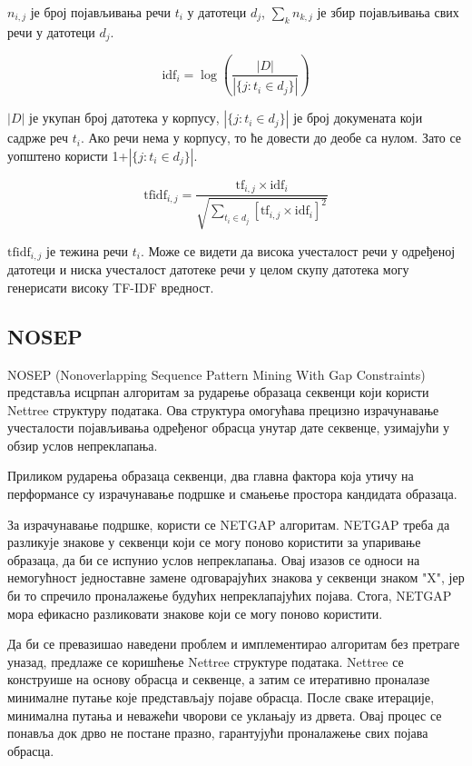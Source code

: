 \documentclass[12pt]{article}
\begin{document}
$n_{i,j}$  је број појављивања речи $t_{i}$ у датотеци $d_{j}$,
$\sum_{k} n_{k,j}$ је збир појављивања свих речи у датотеци
$d_{j}$.

$$\mathrm{idf}_i = \log \left(\frac{|D|}{|\{j : t_i \in d_j\}|}\right) $$

$|D|$ је укупан број датотека у корпусу, $|\{j : t_i \in d_j\}|$
је број докумената који садрже реч $t_{i}$. Ако
речи нема у корпусу, то ће довести до деобе са нулом. Зато се
уопштено користи 1+$|\{j : t_i \in d_j\}|$.

$$\mathrm{tfidf}_{i,j} = \frac{\mathrm{tf}_{i,j} \times \mathrm{idf}_{i}}{\sqrt{\sum_{t_i \in d_j} \left[\mathrm{tf}_{i,j} \times \mathrm{idf}_i\right]^2}}$$


$\mathrm{tfidf}_{i,j}$ је тежина речи ${t}_{i}$. Може се видети да висока
учесталост речи у одређеној датотеци и ниска учесталост датотеке
речи у целом скупу датотека могу генерисати високу TF-IDF вредност. 

\subsection{NOSEP}

NOSEP\cite{8053457} (Nonoverlapping Sequence Pattern Mining With Gap Constraints) представља исцрпан алгоритам за рударење образаца секвенци који користи Nettree структуру података. Ова структура омогућава прецизно израчунавање учесталости појављивања одређеног обрасца унутар дате секвенце, узимајући у обзир услов непреклапања. 

Приликом рударења образаца секвенци, два главна фактора која утичу на перформансе су израчунавање подршке и смањење простора кандидата образаца. 

За израчунавање подршке, користи се NETGAP алгоритам. NETGAP треба да  разликује знакове у секвенци који се могу поново користити за упаривање образаца, да би се испунио услов непреклапања. Овај изазов се односи на немогућност једноставне замене одговарајућих знакова у секвенци знаком "X", јер би то спречило проналажење будућих непреклапајућих појава. Стога, NETGAP мора ефикасно разликовати знакове који се могу поново користити.

Да би се превазишао наведени проблем и имплементирао алгоритам без претраге уназад, предлаже се коришћење Nettree структуре података. Nettree се конструише на основу обрасца и секвенце, а затим се итеративно проналазе минималне путање које представљају појаве обрасца. После сваке итерације, минимална путања и неважећи чворови се уклањају из дрвета. Овај процес се понавља док дрво не постане празно, гарантујући проналажење свих појава обрасца.
\end{document}
